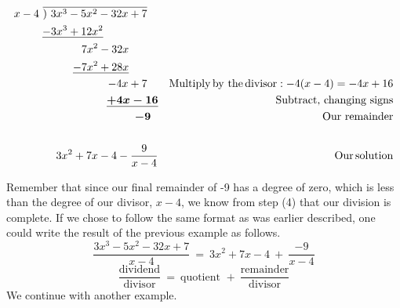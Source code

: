 \begin{example}
\begin{eqnarray*}
    x - 4~ \overline{)~3 x^3 - 5 x^2 - 32 x + 7}~~~ &  & \\
    \underline{- 3 x^3 + 12 x^2 }~~~~~~~~~~~~~~~ &  & \\
    7 x^2 - 32 x~~~~~~~~ &  & \\
    \underline{- 7 x^2 + 28 x}~~~~~~~~ &  & \\
    - 4 x + 7~~~ &  & \operatorname{Multiply} \operatorname{by~the}
    \operatorname{divisor} : - 4 (x - 4) = - 4 x + 16\\
    \boldsymbol{\underline{+ 4 x - 16}} &  & \text{Subtract,~changing~signs}\\
    \boldsymbol{- 9}~~ &  & \operatorname{Our~remainder}\\
    &  & \\
    3 x^2 + 7 x - 4 - \frac{9}{x - 4} &  & \operatorname{Our} \operatorname{solution}
  \end{eqnarray*}
\end{example}
Remember that since our final remainder of -9 has a degree of zero, which is less than the degree of our divisor, $x-4$, we know from step (4) that our division is complete.\pp
If we chose to follow the same format as was earlier described, one could write the result of the previous example as follows.
$$\frac{3x^3-5x^2-32x+7}{x-4}~=~3x^2+7x-4~+~\frac{-9}{x-4}$$ 
$$\frac{\text{dividend}}{\text{divisor}}~=~\text{quotient~}+~\frac{\text{remainder}}{\text{divisor}}$$
\newpage
We continue with another example.

